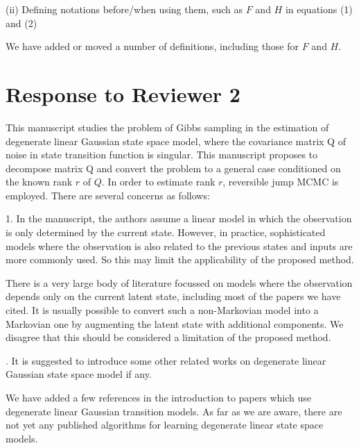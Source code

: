 \documentclass{article}
\newenvironment{review}[0]{\begin{itshape}\color{Gray}\noindent}{\end{itshape}\vspace{0.4cm}}
\newenvironment{response}[0]{\noindent}{\vspace{0.4cm}}
\begin{document}
\begin{review}
(ii) Defining notations before/when using them, such as $F$ and $H$ in equations (1) and (2)
\end{review}

\begin{response}
 We have added or moved a number of definitions, including those for $F$ and $H$.
\end{response}



\section*{Response to Reviewer 2}

\begin{review}
This manuscript studies the problem of Gibbs sampling in the estimation of degenerate linear Gaussian state space model, where the covariance matrix Q of noise in state transition function is singular. This manuscript proposes to decompose matrix Q and convert the problem to a general case conditioned on the known rank $r$ of $Q$. In order to estimate rank $r$, reversible jump MCMC is employed. There are several concerns as follows:

1.  In the manuscript, the authors assume a linear model in which the observation is only determined by the current state. However, in practice, sophisticated models where the observation is also related to the previous states and inputs are more commonly used. So this may limit the applicability of the proposed method.
\end{review}

\begin{response}
 There is a very large body of literature focussed on models where the observation depends only on the current latent state, including most of the papers we have cited. It is usually possible to convert such a non-Markovian model into a Markovian one by augmenting the latent state with additional components. We disagree that this should be considered a limitation of the proposed method.
\end{response}

\begin{review}
2.  It is suggested to introduce some other related works on degenerate linear Gaussian state space model if any.
\end{review}

\begin{response}
 We have added a few references in the introduction to papers which use degenerate linear Gaussian transition models. As far as we are aware, there are not yet any published algorithms for learning degenerate linear state space models.
\end{response}
\end{document}
